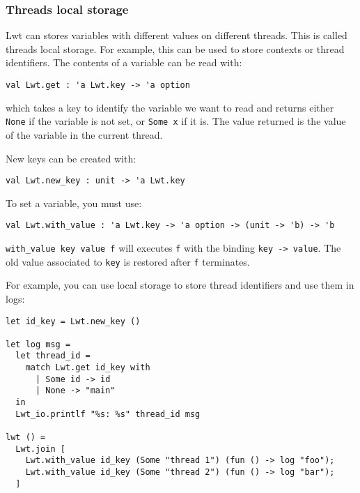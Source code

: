 \subsubsection{ Threads local storage }

Lwt can stores variables with different values on different
threads. This is called threads local storage. For example, this can
be used to store contexts or thread identifiers. The contents of a
variable can be read with:



\lstset{language=[Objective]Caml}\begin{lstlisting}
val Lwt.get : 'a Lwt.key -> 'a option

\end{lstlisting}
which takes a key to identify the variable we want to read and
returns either {\tt None} if the variable is not set, or
{\tt Some x} if it is. The value returned is the value of the
variable in the current thread.



New keys can be created with:



\lstset{language=[Objective]Caml}\begin{lstlisting}
val Lwt.new_key : unit -> 'a Lwt.key

\end{lstlisting}
To set a variable, you must use:



\lstset{language=[Objective]Caml}\begin{lstlisting}
val Lwt.with_value : 'a Lwt.key -> 'a option -> (unit -> 'b) -> 'b

\end{lstlisting}
{\tt with\_value key value f} will executes {\tt f} with
the binding {\tt key -> value}. The old value associated to
{\tt key} is restored after {\tt f} terminates.



For example, you can use local storage to store thread identifiers
and use them in logs:



\lstset{language=[Objective]Caml}\begin{lstlisting}
let id_key = Lwt.new_key ()

let log msg =
  let thread_id =
    match Lwt.get id_key with
      | Some id -> id
      | None -> "main"
  in
  Lwt_io.printlf "%s: %s" thread_id msg

lwt () =
  Lwt.join [
    Lwt.with_value id_key (Some "thread 1") (fun () -> log "foo");
    Lwt.with_value id_key (Some "thread 2") (fun () -> log "bar");
  ]

\end{lstlisting}
